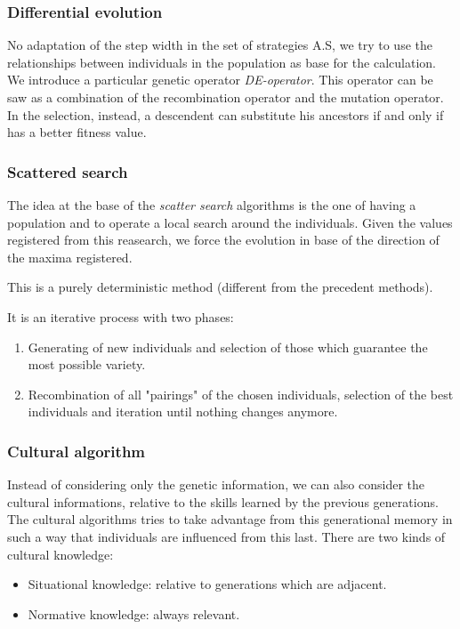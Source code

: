 \documentclass{article}
\begin{document}
\subsubsection{Differential evolution}
No adaptation of the step width in the set of strategies A.S, we try to use the relationships
between individuals in the population as base for the calculation. We introduce a particular
genetic operator \textit{DE-operator}. This operator can be saw as a combination of the
recombination operator and the mutation operator. In the selection, instead, a descendent can
substitute his ancestors if and only if has a better fitness value.


\subsubsection{Scattered search}
The idea at the base of the \textit{scatter search} algorithms is the one of having a population
and to operate a local search around the individuals. Given the values registered from this
reasearch, we force the evolution in base of the direction of the maxima registered.

This is a purely deterministic method (different from the precedent methods).

It is an iterative process with two phases:
\begin{enumerate}
    \item Generating of new individuals and selection of those which guarantee the most
          possible variety.
    \item Recombination of all "pairings" of the chosen individuals, selection of the best
          individuals and iteration until nothing changes anymore.
\end{enumerate}

\subsubsection{Cultural algorithm}
Instead of considering only the genetic information, we can also consider the cultural informations,
relative to the skills learned by the previous generations. The cultural algorithms tries to take
advantage from this generational memory in such a way that individuals are influenced from this
last.
There are two kinds of cultural knowledge:
\begin{itemize}
    \item Situational knowledge: relative to generations which are adjacent.
    \item Normative knowledge: always relevant.
\end{itemize}
\end{document}
